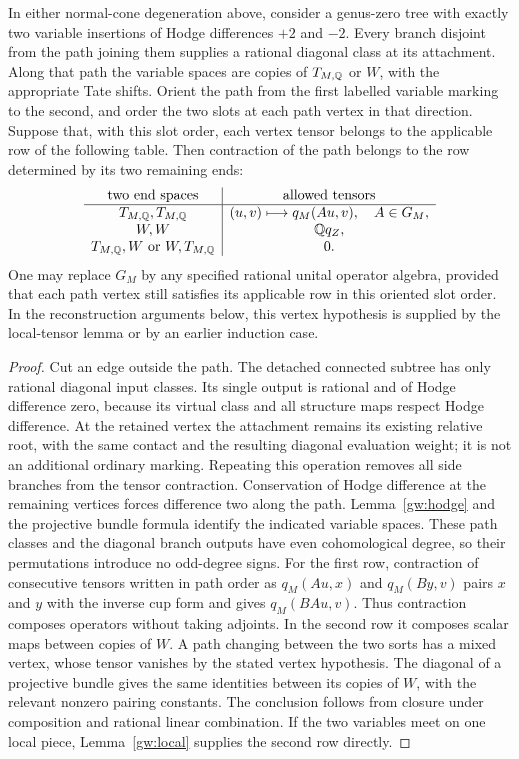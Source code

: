 \begin{lemma}\label{gw:path}
In either normal-cone degeneration above, consider a genus-zero tree with
exactly two variable insertions of
Hodge differences $+2$ and $-2$.  Every branch disjoint from the path joining
them supplies a rational diagonal class at its attachment.  Along that path
the variable spaces are copies of $T_{M,\mathbb Q}$ or $W$, with the appropriate
Tate shifts.  Orient the path from the first labelled variable marking to
the second, and order the two slots at each path vertex in that direction.
Suppose that, with this slot order, each vertex tensor belongs to the
applicable row of the following table.  Then contraction of the path
belongs to the row determined by its two remaining ends:
\[
 \begin{array}{c|c}
 \text{two end spaces}&\text{allowed tensors}\\ \hline
 T_{M,\mathbb Q},T_{M,\mathbb Q}
   & (u,v)\longmapsto q_M(Au,v),\quad A\in G_M,\\
 W,W&\mathbb Q q_Z,\\
 T_{M,\mathbb Q},W\text{ or }W,T_{M,\mathbb Q}&0.
 \end{array}
\]
One may replace $G_M$ by any specified rational unital operator algebra,
provided that each path vertex still satisfies its applicable row in this
oriented slot order.
In the reconstruction arguments below, this vertex hypothesis is supplied
by the local-tensor lemma or by an earlier induction case.
\end{lemma}
\begin{proof}
Cut an edge outside the path.  The detached connected subtree has only
rational diagonal input classes.  Its single output is rational and of
Hodge difference zero, because its virtual class and all structure maps
respect Hodge difference.  At the retained vertex the attachment remains
its existing relative root,
with the same contact and the resulting diagonal evaluation weight; it is
not an additional ordinary marking.  Repeating this operation removes all
side branches from the tensor contraction.  Conservation of Hodge difference
at the remaining vertices forces difference two along the path.  Lemma~\ref{gw:hodge} and the
projective bundle formula identify the indicated variable spaces.
These path classes and the diagonal branch outputs have even cohomological
degree, so their permutations introduce no odd-degree signs.
For the first row, contraction of consecutive tensors written in path order
as $q_M(Au,x)$ and $q_M(By,v)$ pairs $x$ and $y$ with the inverse cup form
and gives $q_M(BAu,v)$.  Thus contraction composes operators without taking
adjoints.  In the second row it composes scalar maps between copies of $W$.
A path changing between the two sorts
has a mixed vertex, whose tensor vanishes by the stated vertex hypothesis.
The diagonal of a projective bundle gives
the same identities between its copies of $W$, with the relevant nonzero
pairing constants.  The conclusion follows from closure under composition
and rational linear combination.  If the two variables meet on one local
piece, Lemma~\ref{gw:local} supplies the second row directly.
\end{proof}

